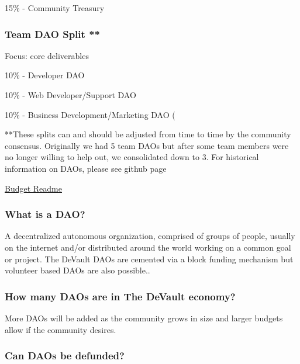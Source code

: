 {15\% - Community Treasury}

\hypertarget{h.6557snl66u3e}{%
\subsubsection{\texorpdfstring{{Team DAO Split
**}}{Team DAO Split **}}\label{h.6557snl66u3e}}

{Focus: core deliverables }

{10\% - Developer DAO }

{10\% - Web Developer/Support DAO }

{10\% - Business Development/Marketing DAO (}

{}

{**These splits can and should be adjusted from time to time by the
community consensus. Originally we had 5 team DAOs but after some team
members were no longer willing to help out, we consolidated down to 3.
For historical information on DAOs, please see github page}

{\href{https://www.google.com/url?q=https://github.com/devaultcrypto/devault/blob/develop/BUDGET.md\&sa=D\&ust=1574537005303000}{Budget
Readme}}

\hypertarget{h.senqx7dniuif}{%
\subsubsection{\texorpdfstring{{What is a
DAO?}}{What is a DAO?}}\label{h.senqx7dniuif}}

{A decentralized autonomous organization, comprised of groups of people,
usually on the internet and/or distributed around the world working on a
common goal or project. The DeVault DAOs are cemented via a block
funding mechanism but volunteer based DAOs are also possible..}

\hypertarget{h.b8kaksu0xjhj}{%
\subsubsection{\texorpdfstring{{How many DAOs are in The DeVault
economy?}}{How many DAOs are in The DeVault economy?}}\label{h.b8kaksu0xjhj}}

{More DAOs will be added as the community grows in size and larger
budgets allow if the community desires.}

\hypertarget{h.m4w86dl6rwcc}{%
\subsubsection{\texorpdfstring{{Can DAOs be
defunded?}}{Can DAOs be defunded?}}\label{h.m4w86dl6rwcc}}

